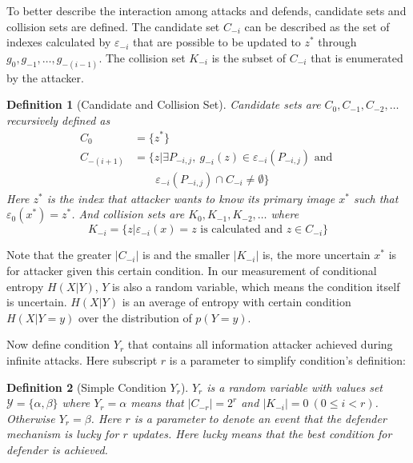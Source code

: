 \documentclass[10pt, conference, compsocconf]{IEEEtran}
\newtheorem{mydef}{Definition}
\begin{document}
        To better describe the interaction among attacks
        and defends, candidate sets and collision sets are defined.
        The candidate set $C_{-i}$ can be described as the set of indexes
        calculated by $\varepsilon_{-i}$ that are possible to be
        updated to $z^*$ through $g_0, g_{-1}, \ldots, g_{-(i-1)}$. The collision set $K_{-i}$ is the
        subset of $C_{-i}$ that is enumerated by the attacker.
        \begin{mydef}[Candidate and Collision Set]
            Candidate sets are $C_0, C_{-1}, C_{-2}, \ldots$ recursively defined as
            \begin{align*}
                C_0 &= \{z^*\}\\
                C_{-(i+1)} &= \{z | \exists P_{-i, j},~
                    g_{-i}(z) \in \varepsilon_{-i}(P_{-i, j}) \text{ and } \\
                    & \;\;\;\;\;\;\; \varepsilon_{-i}(P_{-i, j}) \cap C_{-i} \neq \emptyset \}
            \end{align*}
            Here $z^*$ is the index that attacker wants to know its primary image
            $x^*$ such that $\varepsilon_0(x^*) = z^*$. And collision sets are $K_0, K_{-1}, K_{-2}, \ldots$ where
            \begin{equation*}
                K_{-i} = \{z | \varepsilon_{-i}(x) = z \text{ is calculated and } z \in C_{-i} \}
            \end{equation*}
        \end{mydef}

        Note that the greater $|C_{-i}|$ is and the smaller $|K_{-i}|$ is,
        the more uncertain $x^*$ is for attacker given this certain
        condition. In our measurement
        of conditional entropy $H(X|Y)$, $Y$ is also a random variable,
        which means the condition itself is uncertain. $H(X|Y)$ is
        an average of entropy with certain condition $H(X|Y = y)$
        over the distribution of $p(Y = y)$.

        Now define condition $Y_r$ that contains all information
        attacker achieved during infinite attacks. Here subscript $r$
        is a parameter to simplify condition's definition:
        \begin{mydef}[Simple Condition $Y_r$]
            $Y_r$ is a random variable with values set
            $\mathcal Y = \{ \alpha, \beta \}$ where
            $Y_r = \alpha$ means that $|C_{-r}| = 2^r$
            and $|K_{-i}| = 0~(0 \leq i < r)$.
            Otherwise $Y_r = \beta$.
            Here $r$ is a parameter to denote an event that
            the defender mechanism is lucky for $r$ updates.
            Here lucky means that the best condition for defender is achieved.
        \end{mydef}
\end{document}
